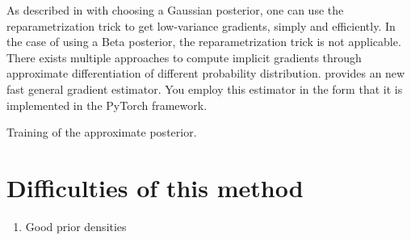 As described in  with choosing a Gaussian posterior, one can use the reparametrization trick to get low-variance gradients, simply and efficiently. In the case of using a Beta posterior, the reparametrization trick is not applicable. There exists multiple approaches to compute implicit gradients through approximate differentiation of different probability distribution. \textcite{figurnovImplicit2019} provides an new fast general gradient estimator. You employ this estimator in the form that it is implemented in the PyTorch framework.

\begin{algorithm}
    \begin{algorithmic}[1]
        \EndFor%
    \end{algorithmic}
    \caption{Training of the approximate posterior.}%
    \label{alg:posterior_training}%
\end{algorithm}

\section{Difficulties of this method}
\begin{enumerate}
    \item Good prior densities
\end{enumerate}
